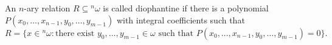 An $n$-ary relation $R \subseteq {}^n\omega$ is called diophantine if there is a polynomial $P(x_0, \ldots, x_{n-1}, y_0, \ldots, y_{m-1})$ with integral coefficients such that
$$R = \{x \in {}^n\omega : \text{there exist } y_0, \ldots, y_{m-1} \in \omega \text{ such that } P(x_0, \ldots, x_{n-1}, y_0, \ldots, y_{m-1}) = 0\}.$$